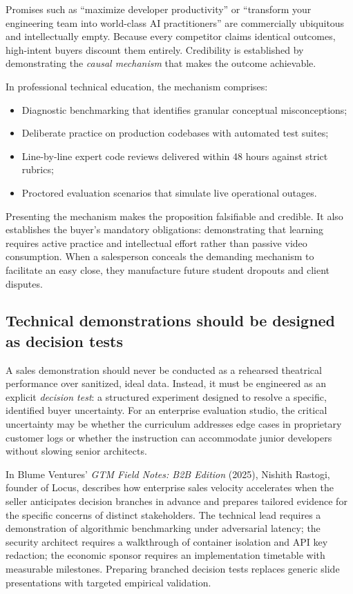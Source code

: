 Promises such as ``maximize developer productivity'' or ``transform your engineering team into world-class AI practitioners'' are commercially ubiquitous and intellectually empty. Because every competitor claims identical outcomes, high-intent buyers discount them entirely. Credibility is established by demonstrating the \textit{causal mechanism} that makes the outcome achievable.

In professional technical education, the mechanism comprises:
\begin{itemize}
\item Diagnostic benchmarking that identifies granular conceptual misconceptions;
\item Deliberate practice on production codebases with automated test suites;
\item Line-by-line expert code reviews delivered within 48 hours against strict rubrics;
\item Proctored evaluation scenarios that simulate live operational outages.
\end{itemize}
Presenting the mechanism makes the proposition falsifiable and credible. It also establishes the buyer's mandatory obligations: demonstrating that learning requires active practice and intellectual effort rather than passive video consumption. When a salesperson conceals the demanding mechanism to facilitate an easy close, they manufacture future student dropouts and client disputes.

\subsection{Technical demonstrations should be designed as decision tests}

A sales demonstration should never be conducted as a rehearsed theatrical performance over sanitized, ideal data. Instead, it must be engineered as an explicit \textit{decision test}: a structured experiment designed to resolve a specific, identified buyer uncertainty. For an enterprise evaluation studio, the critical uncertainty may be whether the curriculum addresses edge cases in proprietary customer logs or whether the instruction can accommodate junior developers without slowing senior architects.

In Blume Ventures' \textit{GTM Field Notes: B2B Edition} (2025), Nishith Rastogi, founder of Locus, describes how enterprise sales velocity accelerates when the seller anticipates decision branches in advance and prepares tailored evidence for the specific concerns of distinct stakeholders. The technical lead requires a demonstration of algorithmic benchmarking under adversarial latency; the security architect requires a walkthrough of container isolation and API key redaction; the economic sponsor requires an implementation timetable with measurable milestones. Preparing branched decision tests replaces generic slide presentations with targeted empirical validation.

